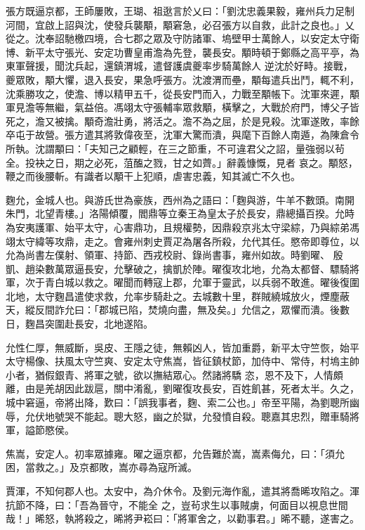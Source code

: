 \begin{pinyinscope}
 張方既逼京都，王師屢敗，王瑚、祖逖言於乂曰：「劉沈忠義果毅，雍州兵力足制河間，宜啟上詔與沈，使發兵襲顒，顒窘急，必召張方以自救，此計之良也。」乂從之。沈奉詔馳檄四境，合七郡之眾及守防諸軍、塢壁甲士萬餘人，以安定太守衛博、新平太守張光、安定功曹皇甫澹為先登，襲長安。顒時頓于鄭縣之高平亭，為東軍聲援，聞沈兵起，還鎮渭城，遣督護虞夔率步騎萬餘人
 逆沈於好畤。接戰，夔眾敗，顒大懼，退入長安，果急呼張方。沈渡渭而壘，顒每遣兵出鬥，輒不利，沈乘勝攻之，使澹、博以精甲五千，從長安門而入，力戰至顒帳下。沈軍來遲，顒軍見澹等無繼，氣益倍。馮翊太守張輔率眾救顒，橫擊之，大戰於府門，博父子皆死之，澹又被擒。顒奇澹壯勇，將活之。澹不為之屈，於是見殺。沈軍遂敗，率餘卒屯于故營。張方遣其將敦偉夜至，沈軍大驚而潰，與麾下百餘人南遁，為陳倉令所執。沈謂顒曰：「夫知己之顧輕，在三之節重，不可違君父之詔，量強弱以茍全。投袂之日，期之必死，菹醢之戮，甘之如薺。」辭義慷慨，見者
 哀之。顒怒，鞭之而後腰斬。有識者以顒干上犯順，虐害忠義，知其滅亡不久也。



 麴允，金城人也。與游氏世為豪族，西州為之語曰：「麴與游，牛羊不數頭。南開朱門，北望青樓。」洛陽傾覆，閻鼎等立秦王為皇太子於長安，鼎總攝百揆。允時為安夷護軍、始平太守，心害鼎功，且規權勢，因鼎殺京兆太守梁綜，乃與綜弟馮翊太守緯等攻鼎，走之。會雍州刺史賈疋為屠各所殺，允代其任。愍帝即尊位，以允為尚書左僕射、領軍、持節、西戎校尉、錄尚書事，雍州如故。時劉曜、
 殷凱、趙染數萬眾逼長安，允擊破之，擒凱於陣。曜復攻北地，允為太都督、驃騎將軍，次于青白城以救之。曜聞而轉寇上郡，允軍于靈武，以兵弱不敢進。曜後復圍北地，太守麴昌遣使求救，允率步騎赴之。去城數十里，群賊繞城放火，煙塵蔽天，縱反間詐允曰：「郡城已陷，焚燒向盡，無及矣。」允信之，眾懼而潰。後數日，麴昌突圍赴長安，北地遂陷。



 允性仁厚，無威斷，吳皮、王隱之徒，無賴凶人，皆加重爵，新平太守竺恢，始平太守楊像、扶風太守竺爽、安定太守焦嵩，皆征鎮杖節，加侍中、常侍，村塢主帥小者，猶假銀青、將軍之號，欲以撫結眾心。然諸將驕
 恣，恩不及下，人情頗離，由是羌胡因此跋扈，關中淆亂，劉曜復攻長安，百姓飢甚，死者太半。久之，城中窘逼，帝將出降，歎曰：「誤我事者，麴、索二公也。」帝至平陽，為劉聰所幽辱，允伏地號哭不能起。聰大怒，幽之於獄，允發憤自殺。聰嘉其忠烈，贈車騎將軍，謚節愍侯。



 焦嵩，安定人。初率眾據雍。曜之逼京都，允告難於嵩，嵩素侮允，曰：「須允困，當救之。」及京都敗，嵩亦尋為寇所滅。



 賈渾，不知何郡人也。太安中，為介休令。及劉元海作亂，遣其將喬晞攻陷之。渾抗節不降，曰：「吾為晉守，不能全
 之，豈茍求生以事賊虜，何面目以視息世間哉！」晞怒，執將殺之，晞將尹崧曰：「將軍舍之，以勸事君。」晞不聽，遂害之。




\end{pinyinscope}
